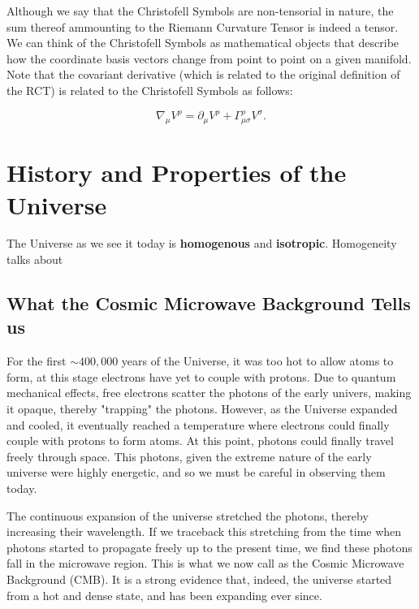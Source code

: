 \documentclass[a4paper,11pt]{article}
\begin{document}
Although we say that the Christofell Symbols are non-tensorial in nature, the 
sum thereof ammounting to the Riemann Curvature Tensor is indeed a tensor. 
We can think of the Christofell Symbols as mathematical objects that describe how the 
coordinate basis vectors change from point to point on a given manifold. Note that
the covariant derivative (which is related to the original definition of the RCT) is related
to the Christofell Symbols as follows:

\begin{equation}
    \nabla_\mu V^\rho = \partial_\mu V^\rho + \Gamma^\rho_{\mu\sigma} V^\sigma.
    \label{covariant-derivative-christofell}
\end{equation}



\section{History and Properties of the Universe}
The Universe as we see it today is \textbf{homogenous} and \textbf{isotropic}. Homogeneity talks about

\subsection{What the Cosmic Microwave Background Tells us}
For the first $\sim400,000$ years of the Universe, it was too hot to allow atoms to form, at
this stage electrons have yet to couple with protons. Due to quantum mechanical effects, free electrons scatter
the photons of the early univers, making it opaque, thereby "trapping" the photons. 
However, as the Universe expanded and cooled, it eventually reached a temperature
where electrons could finally couple with protons to form atoms. At this point,
photons could finally travel freely through space. This photons, given the extreme nature of the early universe
were highly energetic, and so we must be careful in observing them today.

The continuous expansion of the universe
stretched the photons, thereby increasing their wavelength. If we traceback this stretching from the time when 
photons started to propagate freely up to the present time, we find these photons fall in the microwave region. 
This is what we now call as the Cosmic Microwave Background (CMB). It is a strong evidence that, indeed, 
the universe started from a hot and dense state, and has been expanding ever since. 
\end{document}

